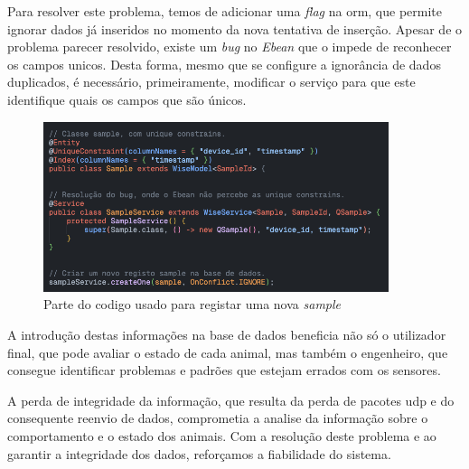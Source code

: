 \clearpage
Para resolver este problema, temos de adicionar uma \textit{flag} na \acs{orm}, que permite ignorar dados já inseridos no momento da nova tentativa de inserção. Apesar de o problema parecer resolvido, existe um \textit{bug} no \textit{Ebean} que o impede de reconhecer os campos unicos. Desta forma, mesmo que se configure a ignorância de dados duplicados, é necessário, primeiramente, modificar o serviço para que este identifique quais os campos que são únicos.

\begin{figure}[!h]
	\centering
	\includegraphics[width=0.9\textwidth]{figs/codigoParaGuardarSamples.png}
	\caption{Parte do codigo usado para registar uma nova \textit{sample}}
	\label{fig:codeForNewSample}
\end{figure}



A introdução destas informações na base de dados beneficia não só o utilizador final, que pode avaliar o estado de cada animal, mas também o engenheiro, que consegue identificar problemas e padrões que estejam errados com os sensores.

A perda de integridade da informação, que resulta da perda de pacotes \acs{udp} e do consequente reenvio de dados, comprometia a analise da informação sobre o comportamento e o estado dos animais. Com a resolução deste problema e ao garantir a integridade dos dados, reforçamos a fiabilidade do sistema.

